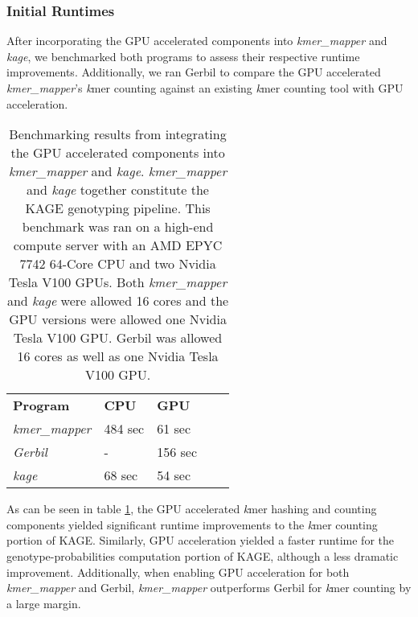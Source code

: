\subsubsection{Initial Runtimes} \label{results:benchmarking:initial_runtimes}
After incorporating the GPU accelerated components into \textit{kmer\_mapper} and \textit{kage}, we benchmarked both programs to assess their respective runtime improvements.
Additionally, we ran Gerbil \cite{gerbil} to compare the GPU accelerated \textit{kmer\_mapper}'s \textit{k}mer counting against an existing \textit{k}mer counting tool with GPU acceleration.
\begin{table}[H]
\begin{center}
\begin{tabular}{lllll}
  \multicolumn{1}{l|}{\textbf{Program}} & \multicolumn{1}{l}{\textbf{CPU}} & \multicolumn{1}{l}{\textbf{GPU}} & \\ \cline{1-3}
  \multicolumn{1}{l|}{\textit{kmer\_mapper}} & \multicolumn{1}{l}{484 sec} & \multicolumn{1}{l}{61 sec} & \\
  \multicolumn{1}{l|}{\textit{Gerbil}} & \multicolumn{1}{l}{-} & \multicolumn{1}{l}{156 sec} & \\
  \multicolumn{1}{l|}{\textit{kage}} & \multicolumn{1}{l}{68 sec} & \multicolumn{1}{l}{54 sec} & \\
\end{tabular}
\end{center}
\caption{
  Benchmarking results from integrating the GPU accelerated components into \textit{kmer\_mapper} and \textit{kage}.
  \textit{kmer\_mapper} and \textit{kage} together constitute the KAGE genotyping pipeline.
  This benchmark was ran on a high-end compute server with an AMD EPYC 7742 64-Core CPU and two Nvidia Tesla V100 GPUs.
  Both \textit{kmer\_mapper} and \textit{kage} were allowed 16 cores and the GPU versions were allowed one Nvidia Tesla V100 GPU.
  Gerbil was allowed 16 cores as well as one Nvidia Tesla V100 GPU.
}
\label{results:benchmarking:initial_runtimes:tables:runtimes}
\end{table}

As can be seen in table \ref{results:benchmarking:initial_runtimes:tables:runtimes}, the GPU accelerated \textit{k}mer hashing and counting components yielded significant runtime improvements to the \textit{k}mer counting portion of KAGE.
Similarly, GPU acceleration yielded a faster runtime for the genotype-probabilities computation portion of KAGE, although a less dramatic improvement.
Additionally, when enabling GPU acceleration for both \textit{kmer\_mapper} and Gerbil, \textit{kmer\_mapper} outperforms Gerbil for \textit{k}mer counting by a large margin.


